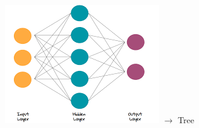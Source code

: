 \documentclass[aspectratio=43]{beamer}
\begin{document}
\begin{frame}
\begin{figure}
		\endminipage
		\hspace*{-1.25cm}	
		\includegraphics[width = 1.25\linewidth]{plots/NN.png}
		\endminipage
		\hspace*{0.75cm}
		$\longrightarrow$
		{\color{darkgreen}Tree \checkmark}
		\endminipage
		
	\end{figure}

\end{frame}
\end{document}

